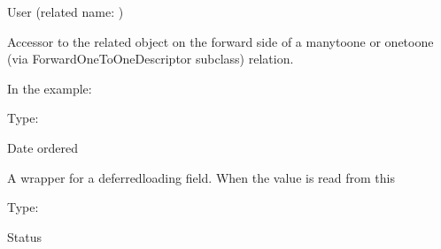 \documentclass[letterpaper,10pt,russian]{sphinxmanual}
\begin{document}
\begin{fulllineitems}
\begin{fulllineitems}
\sphinxAtStartPar
User (related name: )

\sphinxAtStartPar
Accessor to the related object on the forward side of a many\sphinxhyphen{}to\sphinxhyphen{}one or
one\sphinxhyphen{}to\sphinxhyphen{}one (via ForwardOneToOneDescriptor subclass) relation.

\sphinxAtStartPar
In the example:

\begin{sphinxVerbatim}[commandchars=\\\{\}]
       
\end{sphinxVerbatim}

\end{fulllineitems}


\begin{fulllineitems}
\label{\detokenize{myapp:polls.models.Order.date_ordered}}
\pysigstartsignatures
\pysigline
{}
\pysigstopsignatures
\sphinxAtStartPar
Type: 

\sphinxAtStartPar
Date ordered

\sphinxAtStartPar
A wrapper for a deferred\sphinxhyphen{}loading field. When the value is read from this

\end{fulllineitems}


\begin{fulllineitems}
\label{\detokenize{myapp:polls.models.Order.status}}
\pysigstartsignatures
\pysigline
{}
\pysigstopsignatures
\sphinxAtStartPar
Type: 

\sphinxAtStartPar
Status


\end{fulllineitems}
\end{fulllineitems}
\end{document}

